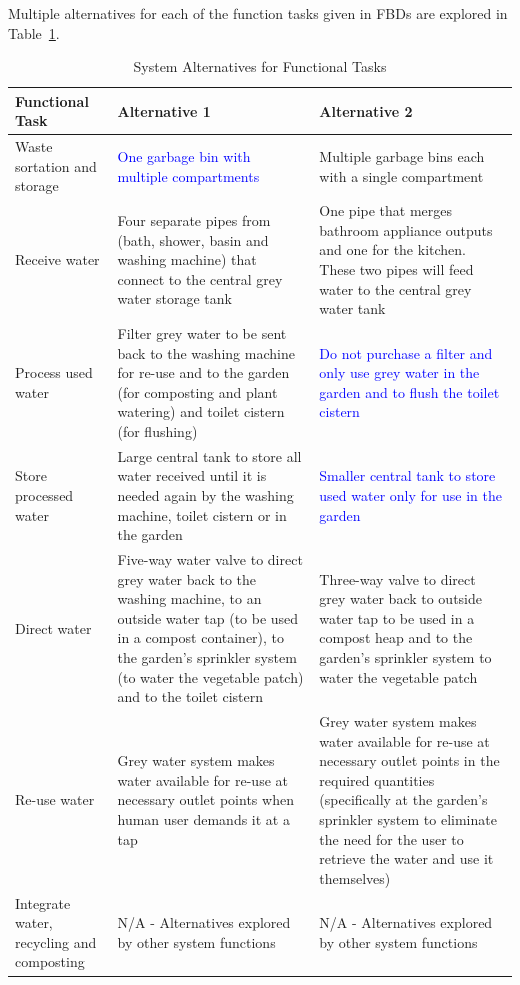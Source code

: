 \documentclass[a4paper,11pt,fleqn]{report}
\begin{document}
Multiple alternatives for each of the function tasks given in \ac{FBD}s are explored in Table~\ref{tb: FunctionalTasks}.
%
\begin{table}[h!]
\caption {System Alternatives for Functional Tasks} \label{tb: FunctionalTasks} 
\begin{center}
\begin{tabular}{p{3.5cm}|p{6cm}|p{6cm}}\toprule
	{\textbf{Functional Task}} & {\textbf{Alternative 1}} & {\textbf{Alternative 2}}\\ \midrule
    Waste sortation and storage & \textcolor{blue}{One garbage bin with multiple compartments} & Multiple garbage bins each with a single compartment\\
    \hline
    Receive water & Four separate pipes from (bath, shower, basin and washing machine) that connect to the central grey water storage tank & One pipe that merges bathroom appliance outputs and one for the kitchen. These two pipes will feed water to the central grey water tank\\
    \hline
    Process used water & Filter grey water to be sent back to the washing machine for re-use and to the garden (for composting and plant watering) and toilet cistern (for flushing) & \textcolor{blue}{Do not purchase a filter and only use grey water in the garden and to flush the toilet cistern}\\
    \hline
    Store processed water & Large central tank to store all water received until it is needed again by the washing machine, toilet cistern or in the garden & \textcolor{blue}{Smaller central tank to store used water only for use in the garden}\\
    \hline
    Direct water & Five-way water valve to direct grey water back to the washing machine, to an outside water tap (to be used in a compost container), to the garden's sprinkler system (to water the vegetable patch) and to the toilet cistern & Three-way valve to direct grey water back to outside water tap to be used in a compost heap and to the garden's sprinkler system to water the vegetable patch\\
    \hline
    Re-use water & Grey water system makes water available for re-use at necessary outlet points when human user demands it at a tap & Grey water system makes water available for re-use at necessary outlet points in the required quantities (specifically at the garden's sprinkler system to eliminate the need for the user to retrieve the water and use it themselves)\\
    \hline
    Integrate water, recycling and composting & N/A - Alternatives explored by other system functions & N/A - Alternatives explored by other system functions\\

\end{tabular}
\end{center}
\end{table}
\end{document}
